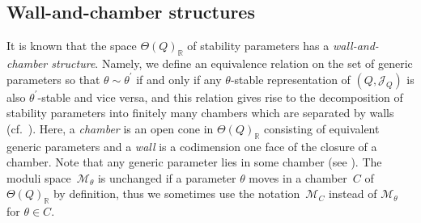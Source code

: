 \documentclass[10pt,a4paper]{amsart}
\numberwithin{equation}{section}
\theoremstyle{definition}
\newcommand{\RR}{\mathbb{R}}
\newcommand{\calJ}{\mathcal{J}}
\newcommand{\calM}{\mathcal{M}}
\begin{document}
\subsection{Wall-and-chamber structures}
\label{subsec_wall_chamber}

It is known that the space $\Theta(Q)_\RR$ of stability parameters has a \emph{wall-and-chamber structure}.
Namely, we define an equivalence relation on the set of generic parameters so that $\theta\sim \theta^\prime$
if and only if any $\theta$-stable representation of $(Q,\calJ_Q)$ is also $\theta^\prime$-stable and vice versa,
and this relation gives rise to the decomposition of stability parameters into finitely many chambers which are separated by walls (cf.\ \cite{DH_GIT, thadd_GIT}).
Here, a \emph{chamber} is an open cone in $\Theta(Q)_\RR$ consisting of equivalent generic parameters
and a \emph{wall} is a codimension one face of the closure of a chamber.
Note that any generic parameter lies in some chamber (see \cite[Lemma~6.1]{IU_anycrepant}).
The moduli space~$\calM_\theta$ is unchanged if a parameter $\theta$ moves in a chamber~$C$ of $\Theta(Q)_\RR$ by definition,
thus we sometimes use the notation~$\calM_C$ instead of $\calM_\theta$ for $\theta\in C$.
\end{document}
